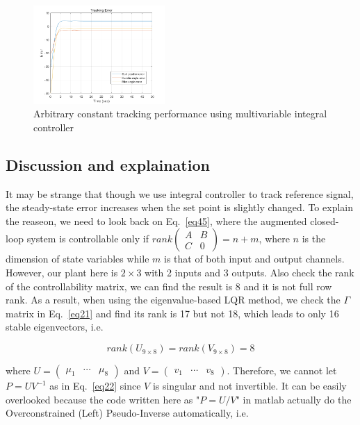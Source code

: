 \documentclass[hyperref]{article}
\theoremstyle{nonumberplain}
\begin{document}
\begin{figure}[H]
\begin{minipage}[t]{0.3\textwidth}
		\end{minipage}
		\begin{minipage}[t]{0.3\textwidth}
			\centering
			\includegraphics[width=5cm]{fig57.png}
		\end{minipage}
		\caption{Arbitrary constant tracking performance using multivariable integral controller}
		\label{fig29}
	\end{figure}
	
	\subsection{Discussion and explaination}
	
	\hspace{1.0em}
	It may be strange that though we use integral controller to track reference signal, the steady-state error increases when the set point is slightly changed. To explain the reaseon, we need to look back on Eq.~\ref{eq45}, where the augmented closed-loop system is controllable only if $rank\begin{pmatrix}
	A &B \\ 
	C &0 
	\end{pmatrix}=n+m$, where $n$ is the dimension of state variables while $m$ is that of both input and output channels. However, our plant here is $2\times 3$ with 2 inputs and 3 outputs. Also check the rank of the controllability matrix, we can find the result is 8 and it is not full row rank. As a result, when using the eigenvalue-based LQR method, we check the $\Gamma$ matrix in Eq.~\ref{eq21} and find its rank is 17 but not 18, which leads to only 16 stable eigenvectors, i.e.
	
	\begin{equation}
	rank(U_{9\times 8})=rank(V_{9\times 8})=8
	\label{eq48}
	\end{equation}
	
	where $U=\begin{pmatrix}
		\mu _{1} &\cdots   & \mu _{8}
	\end{pmatrix}$ and $
	V=\begin{pmatrix}
		v_{1} &\cdots   & v_{8}
	\end{pmatrix}$. Therefore, we cannot let $P=UV^{-1}$ as in Eq.~\ref{eq22} since $V$ is singular and not invertible. It can be easily overlooked because the code written here as "$P=U/V$" in matlab actually do the Overconstrained (Left) Pseudo-Inverse automatically, i.e.
	
\end{document}
